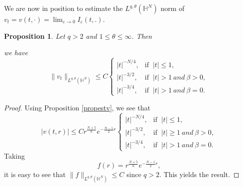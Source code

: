 \documentclass[10pt,leqno]{amsart}
\newcommand{\huom}[2][1=]{\todo[linecolor=red,backgroundcolor=red!10,bordercolor=red,#1]{#2}}
\newtheorem{prop}{Proposition}[section]
\numberwithin{equation}{section}
\begin{document}
We are now in position to estimate the $L^{q,\theta}(\mathbb{H}^N)$ norm of $v_t=v(t,\cdot)=\lim_{\varepsilon \rightarrow 0}I_\varepsilon (t,.)$. %

\begin{prop} %
Let $q>2$ and $1\leq \theta\leq \infty$. Then 

we have 
\[
\|v_t\|_{L^{q,\theta}(\mathbb{H}^N )}\leq C\begin{cases} |t|^{-N/4},&\mbox{if }\ |t|\leq 1,\\   |t|^{-3/2},&\mbox{if }\ |t|>1 \ and\ \beta>0,\\  |t|^{-3/4},&\mbox{if }\ |t|>1 \ and\ \beta=0.  \end{cases}
\]
\end{prop}

\begin{proof}
Using Proposition \ref{propestv}, we see that
$$|v(t,r)|\le C r^{\frac{N+5}{6}} e^{-\frac{N-1}{2}r} \begin{cases}|t|^{-N/4},&\mbox{if }\ |t|\leq 1,\\ |t|^{-3/2},&\mbox{if }\ |t|\geq 1\ and\ \beta>0,\\ |t|^{-3/4},&\mbox{if }\ |t|>1 \ and\ \beta=0.  \end{cases}$$
Taking 
\[
f(r)=r^{\frac{N+5}{6}} e^{-\frac{N-1}{2}r},
\]
 it is easy to see that $\|f\|_{L^{q,\theta}(\mathbb{H}^N)}\leq C$ since $q>2$. This yields the result.
\end{proof}
\end{document}
